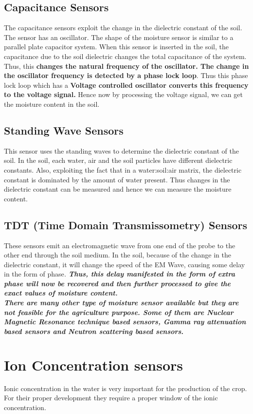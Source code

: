 \documentclass[11pt]{article}
\begin{document}
\subsection{Capacitance Sensors}
The capacitance sensors exploit the change in the dielectric constant of the soil. The sensor has an oscillator. The shape of the moisture sensor is similar to a parallel plate capacitor system. When this sensor is inserted in the soil, the capacitance due to the soil dielectric changes the total capacitance of the system. Thus, this\textbf{ changes the natural frequency of the oscillator. The change in the oscillator frequency is detected by a phase lock loop}. Thus this phase lock loop which has a\textbf{ Voltage controlled oscillator converts this frequency to the voltage signal.} Hence now by processing the voltage signal, we can get the moisture content in the soil.

\subsection{Standing Wave Sensors}
This sensor uses the standing waves to determine the dielectric constant of the soil. In the soil, each water, air and the soil particles have different dielectric constants. Also, exploiting the fact that in a water:soil:air matrix, the dielectric constant is dominated by the amount of water present. Thus changes in the dielectric constant can be measured and hence we can measure the moisture content.
\subsection{TDT (Time Domain Transmissometry) Sensors}
These sensors emit an electromagnetic wave from one end of the probe to the other end through the soil medium. In the soil, because of the change in the dielectric constant, it will change the speed of the EM Wave, causing some delay in the form of phase\textit{.\textbf{ Thus, this delay manifested in the form of extra phase will now be recovered and then further processed to give the exact values of moisture content.}}
\pagebreak
\\
\textbf{
\emph{There are many other type of moisture sensor available but they are not feasible for the agriculture purpose. Some of them are Nuclear Magnetic Resonance technique based sensors, Gamma ray attenuation based sensors and Neutron scattering based sensors}.}

\section{Ion Concentration sensors}
Ionic concentration in the water is very important for the production of the crop. For their proper development they require a proper window of the ionic concentration. 
\end{document}

